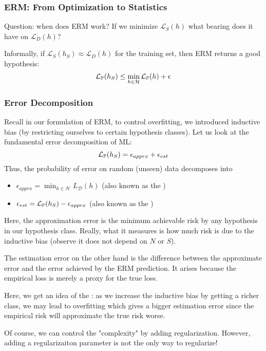 \documentclass[11pt]{scrartcl}
\begin{document}
\subsubsection{ERM: From Optimization to Statistics}
Question: when does ERM work? If we minimize $\mathcal{L}_S(h)$ what bearing does it have on $\mathcal{L}_D(h)$? 

Informally, if $\mathcal{L}_{S}(h_S) \approx \mathcal{L}_{D}(h)$ for the training set, then ERM returns a good hypothesis: 
$$\mathcal{L}_{\mathbb{P}}(h_S) \le \min_{h \in \mathcal{H}}\mathcal{L}_{\mathbb{P}}(h)+\epsilon$$

\subsubsection{Error Decomposition}
Recall in our formulation of ERM, to control overfitting, we introduced inductive bias (by restricting ourselves to certain hypothesis classes). Let us look at the fundamental error decomposition of ML:
$$\mathcal{L}_{\mathbb{P}}(h_S) =\epsilon_{apprx}+\epsilon_{est}$$
Thus, the probability of error on random (unseen) data decomposes into 
\begin{itemize}
    \item $\epsilon_{apprx}=\min_{h \in \mathcal{H}}L_{\mathcal{D}}(h)$ (also known as the )
    \item $\epsilon_{est}=\mathcal{L}_{\mathbb{P}}(h_S)-\epsilon_{apprx}$ (also known as the )
\end{itemize}

Here, the approximation error is the minimum achievable risk by any hypothesis in our hypothesis class. Really, what it measures is how much risk is due to the inductive bias (observe it does not depend on $N$ or $S$).

The estimation error on the other hand is the difference between the approximate error and the error achieved by the ERM prediction. It arises because the empirical loss is merely a proxy for the true loss. 

Here, we get an idea of the : as we increase the inductive bias by getting a richer class, we may lead to overfitting which gives a bigger estimation error since the empirical risk will approximate the true risk worse. 

Of course, we can control the "complexity" by adding regularization. However, adding a regularizaiton parameter is not the only way to regularize!
\end{document}
